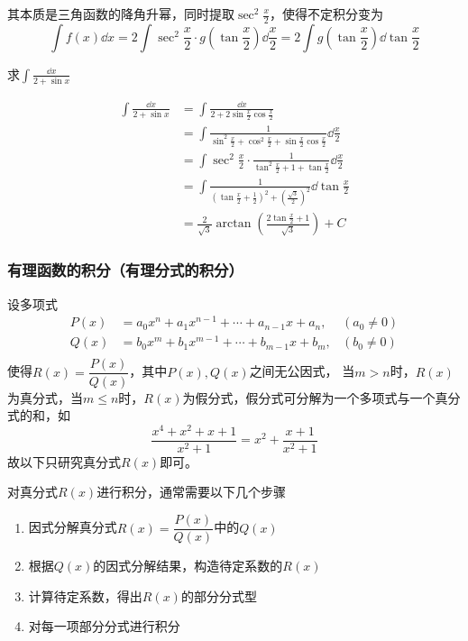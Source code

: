 其本质是三角函数的降角升幂，同时提取$\sec^2\frac{x}{2}$，使得不定积分变为
\[ \int f(x)\dd{x} = 2\int \sec^2\frac{x}{2}\cdot g\left(\tan\frac{x}{2}\right) \dd{\frac{x}{2}} = 2\int g\left(\tan\frac{x}{2}\right)\dd{\tan\frac{x}{2}} \]

\begin{example}
    求$\displaystyle\int\frac{\dd{x}}{2+\sin x}$
\end{example}
\begin{solution}
    \begin{align*}
        \int\frac{\dd{x}}{2+\sin x}
         & = \int\frac{\dd{x}}{2+2\sin\frac{x}{2} \cos\frac{x}{2}}                                                              \\
         & = \int\frac{1}{\sin^2\frac{x}{2} + \cos^2\frac{x}{2} + \sin\frac{x}{2} \cos\frac{x}{2}}\dd{\frac{x}{2}}              \\
         & = \int\sec^2\frac{x}{2} \cdot \frac{1}{\tan^2\frac{x}{2} + 1 + \tan\frac{x}{2}} \dd{\frac{x}{2}}                     \\
         & = \int\frac{1}{\left(\tan\frac{x}{2} + \frac{1}{2}\right)^2 + \left(\frac{\sqrt{3}}{2}\right)^2}\dd{\tan\frac{x}{2}} \\
         & = \frac{2}{\sqrt{3}}\arctan\left(\frac{2\tan\frac{x}{2}+1}{\sqrt{3}}\right) + C
    \end{align*}
\end{solution}

\subsubsection{有理函数的积分（有理分式的积分）}
设多项式
\begin{align*}
    P(x) & = a_0x^n + a_1x^{n-1} + \cdots + a_{n-1}x + a_n, & (a_0\neq 0) \\
    Q(x) & = b_0x^m + b_1x^{m-1} + \cdots + b_{m-1}x + b_m, & (b_0\neq 0) \\
\end{align*}
使得$R(x)=\dfrac{P(x)}{Q(x)}$，其中$P(x),Q(x)$之间无公因式，
当$m>n$时，$R(x)$为真分式，当$m\leq n$时，$R(x)$为假分式，假分式可分解为一个多项式与一个真分式的和，如
\[ \frac{x^4 + x^2 + x + 1}{x^2 + 1} = x^2 + \frac{x + 1}{x^2 + 1} \]
故以下只研究真分式$R(x)$即可。

对真分式$R(x)$进行积分，通常需要以下几个步骤
\begin{enumerate}[(1)]
    \item 因式分解真分式$R(x)=\dfrac{P(x)}{Q(x)}$中的$Q(x)$
    \item 根据$Q(x)$的因式分解结果，构造待定系数的$R(x)$
    \item 计算待定系数，得出$R(x)$的部分分式型
    \item 对每一项部分分式进行积分
\end{enumerate}

